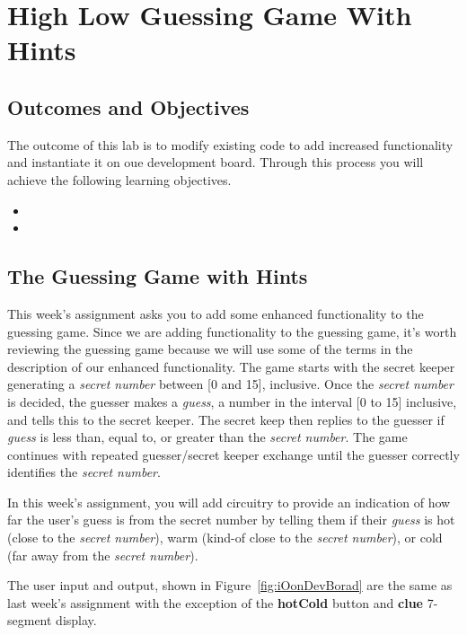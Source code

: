 \chapter{High Low Guessing Game With Hints}
\label{chapter:hlggwh}
\graphicspath{ {./Lab05HighLowWithHints/Fig} }



\section{Outcomes and Objectives}

The outcome of this lab is to modify existing code to add increased
functionality and instantiate it on oue development board.
Through this process you will achieve the following
learning objectives.
\begin{itemize}
	\itemsep=0em
	\item {}
	\item {}
\end{itemize}


\section{The Guessing Game with Hints}

This week's assignment asks you to add some enhanced functionality to
the guessing game. Since we are adding functionality to the guessing
game, it's worth reviewing the guessing game because we will use some of
the terms in the description of our enhanced functionality. The game
starts with the secret keeper generating a \emph{secret number} between
{[}0 and 15{]}, inclusive. Once the \emph{secret number} is decided, the
guesser makes a \emph{guess}, a number in the interval {[}0 to 15{]}
inclusive, and tells this to the secret keeper. The secret keep then
replies to the guesser if \emph{guess} is less than, equal to, or
greater than the \emph{secret number}. The game continues with repeated
guesser/secret keeper exchange until the guesser correctly identifies
the \emph{secret number}.

In this week's assignment, you will add circuitry to provide an
indication of how far the user's guess is from the secret number by
telling them if their \emph{guess} is hot (close to the \emph{secret
number}), warm (kind-of close to the \emph{secret number}), or cold (far
away from the \emph{secret number}).

The user input and output, shown in Figure~\ref{fig:iOonDevBorad} are the same as last week's
assignment with the exception of the \textbf{hotCold} button and
\textbf{clue} 7-segment display.

